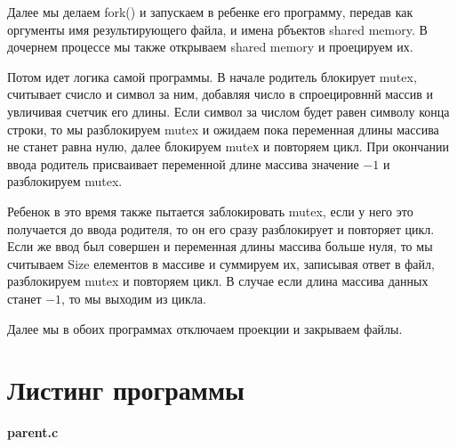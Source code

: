 \documentclass[pdf, unicode, 12pt, a4paper,oneside,fleqn]{article}
\begin{document}
Далее мы делаем fork() и запускаем в ребенке его программу, передав как оргументы имя результирующего файла,
и имена рбъектов shared memory. В дочернем процессе мы также открываем shared memory и проецируем их.

Потом идет логика самой программы. В начале родитель блокирует mutex, считывает счисло и символ за ним, добавляя число в спроецировннй массив и увличивая счетчик его длины.
Если символ за числом будет равен символу конца строки, то мы разблокируем mutex и ожидаем пока 
переменная длины массива не станет равна нулю, далее блокируем muteх и повторяем цикл. При окончании ввода родитель присваивает 
переменной длине массива значение $-1$ и разблокируем mutex.

Ребенок в это время также пытается заблокировать mutex, если у него это получается до ввода родителя, то 
он его сразу разблокирует и повторяет цикл. Если же ввод был совершен и переменная длины массива больше нуля,
то мы считываем Size елементов в массиве и суммируем их, записывая ответ в файл, разблокируем mutex и повторяем цикл.
В случае если длина массива данных станет $-1$, то мы выходим из цикла.

Далее мы в обоих программах отключаем проекции и закрываем файлы.


\section{Листинг программы}

{\large\textbf{parent.c}}
\end{document}
